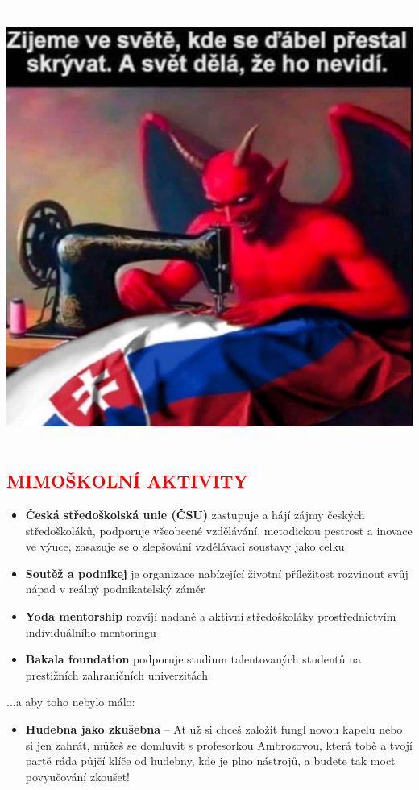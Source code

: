 \documentclass{article}
\newcommand{\podnadpis}[1]{
  \subsection*{\textcolor{red}{#1}}
}
\begin{document}
\begin{redbox}
\begin{minipage}{0.32\linewidth}
    \centering \textcolor{white}{aa}
  \end{minipage}
  \hfill
  \begin{minipage}{0.32\linewidth}
    \includegraphics[width=\linewidth]{dulezite.jpg}
    \centering \textcolor{white}{aa}
  \end{minipage}
\end{redbox}

\podnadpis{MIMOŠKOLNÍ AKTIVITY}
\begin{itemize}[leftmargin=10pt]
  \item \textbf{Česká středoškolská unie (ČSU)} zastupuje a hájí zájmy českých středoškoláků,  podporuje všeobecné vzdělávání, metodickou pestrost a inovace ve výuce, zasazuje se o zlepšování vzdělávací soustavy jako celku
  \item \textbf{Soutěž a podnikej} je organizace nabízející životní příležitost rozvinout svůj nápad v reálný podnikatelský záměr
  \item \textbf{Yoda mentorship} rozvíjí nadané a aktivní středoškoláky prostřednictvím individuálního mentoringu
  \item \textbf{Bakala foundation} podporuje studium talentovaných studentů na prestižních zahraničních univerzitách
\end{itemize}
...a aby toho nebylo málo:

\begin{itemize}[leftmargin=10pt]
    \item \textbf{Hudebna jako zkušebna} -- Ať už si chceš založit fungl novou kapelu nebo si jen zahrát, můžeš se domluvit s profesorkou Ambrozovou, která tobě a tvojí partě ráda půjčí klíče od hudebny, kde je plno nástrojů, a budete tak moct povyučování zkoušet!
\end{itemize}
\end{document}
